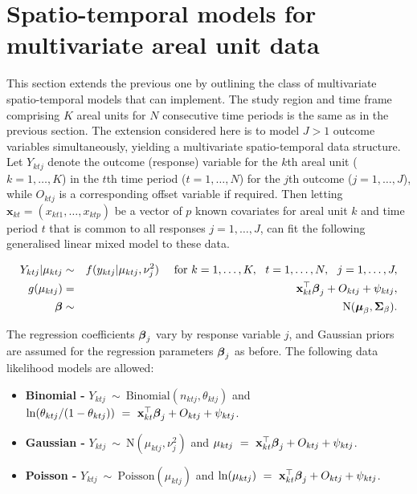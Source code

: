 \documentclass[article, nojss]{jss}
\newcommand{\bd}[1]{\ensuremath{\mbox{\boldmath $#1$}}}
\begin{document}
\section{Spatio-temporal models for multivariate areal unit data}\label{section3}
This section extends the previous one by outlining the class of multivariate spatio-temporal models that  can implement. The study region and time frame comprising $K$ areal units for $N$ consecutive time periods is the same as in the previous section. The extension considered here is to model $J>1$ outcome variables simultaneously, yielding a multivariate spatio-temporal data structure. Let $Y_{ktj}$ denote the outcome (response) variable for the $k$th areal unit ($k=1,\ldots,K$) in the $t$th time period ($t=1,\ldots,N$) for the $j$th outcome ($j=1,\ldots,J$), while $O_{ktj}$ is a corresponding offset variable if required. Then letting $\mathbf{x}_{kt}=(x_{kt1},\ldots, x_{ktp})$ be a vector of $p$ known covariates for areal unit $k$ and time period $t$ that is common to all responses $j=1,\ldots,J$,  can fit the following generalised linear mixed model to these data.

\begin{eqnarray}
Y_{ktj}|\mu_{ktj}&\sim&f(y_{ktj}|\mu_{ktj},\nu^{2}_j)~~~~\mbox{for }k=1,\ldots,K,~~t=1,\ldots,N,~~j=1,\ldots,J,\label{equation likelihood2}\\
g(\mu_{ktj})&=&\mathbf{x}_{kt}^{\top}\bd{\beta}_j + O_{ktj} + \psi_{ktj},\nonumber\\
\bd{\beta}&\sim&\mbox{N}(\bd{\mu}_{\beta}, \bd{\Sigma}_{\beta}).\nonumber
\end{eqnarray}

The regression coefficients $\bd{\beta}_j$ vary by response variable $j$, and Gaussian priors are assumed for the regression parameters $\bd{\beta}_j$ as before. The following data likelihood models are allowed:

\begin{itemize}
\item \textbf{Binomial - } $Y_{ktj}~\sim~\mbox{Binomial}(n_{ktj}, \theta_{ktj})$ and $\ln(\theta_{ktj}/(1-\theta_{ktj}))~=~\mathbf{x}_{kt}^{\top}\bd{\beta}_j + O_{ktj} + \psi_{ktj}$. 

\item \textbf{Gaussian - } $Y_{ktj}~\sim~\mbox{N}(\mu_{ktj}, \nu^2_j)$ and $\mu_{ktj}~=~\mathbf{x}_{kt}^{\top}\bd{\beta}_j + O_{ktj} + \psi_{ktj}$.

\item \textbf{Poisson - } $Y_{ktj}~\sim~\mbox{Poisson}(\mu_{ktj})$ and $\ln(\mu_{ktj})~=~\mathbf{x}_{kt}^{\top}\bd{\beta}_j + O_{ktj} + \psi_{ktj}$. 
\end{itemize}
\end{document}
